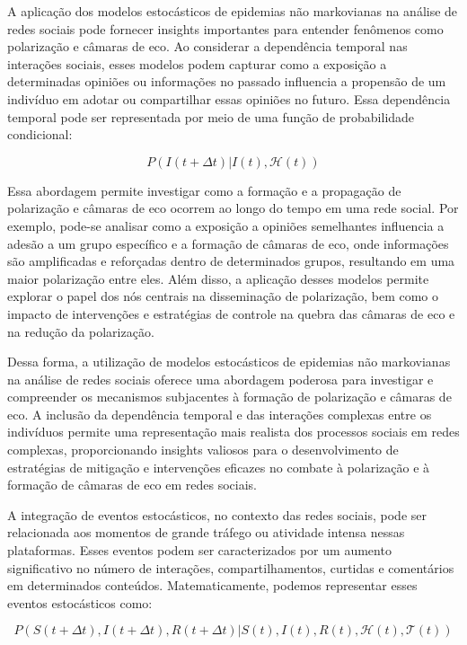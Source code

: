 A aplicação dos modelos estocásticos de epidemias não markovianas na análise de redes sociais pode fornecer insights importantes para entender fenômenos como polarização e câmaras de eco. Ao considerar a dependência temporal nas interações sociais, esses modelos podem capturar como a exposição a determinadas opiniões ou informações no passado influencia a propensão de um indivíduo em adotar ou compartilhar essas opiniões no futuro. Essa dependência temporal pode ser representada por meio de uma função de probabilidade condicional:

\begin{equation}
	P(I(t+\Delta t)|I(t), \mathcal{H}(t))
\end{equation}

Essa abordagem permite investigar como a formação e a propagação de polarização e câmaras de eco ocorrem ao longo do tempo em uma rede social. Por exemplo, pode-se analisar como a exposição a opiniões semelhantes influencia a adesão a um grupo específico e a formação de câmaras de eco, onde informações são amplificadas e reforçadas dentro de determinados grupos, resultando em uma maior polarização entre eles. Além disso, a aplicação desses modelos permite explorar o papel dos nós centrais na disseminação de polarização, bem como o impacto de intervenções e estratégias de controle na quebra das câmaras de eco e na redução da polarização.

Dessa forma, a utilização de modelos estocásticos de epidemias não markovianas na análise de redes sociais oferece uma abordagem poderosa para investigar e compreender os mecanismos subjacentes à formação de polarização e câmaras de eco. A inclusão da dependência temporal e das interações complexas entre os indivíduos permite uma representação mais realista dos processos sociais em redes complexas, proporcionando insights valiosos para o desenvolvimento de estratégias de mitigação e intervenções eficazes no combate à polarização e à formação de câmaras de eco em redes sociais.

A integração de eventos estocásticos, no contexto das redes sociais, pode ser relacionada aos momentos de grande tráfego ou atividade intensa nessas plataformas. Esses eventos podem ser caracterizados por um aumento significativo no número de interações, compartilhamentos, curtidas e comentários em determinados conteúdos. Matematicamente, podemos representar esses eventos estocásticos como:

\begin{equation}
	P(S(t+\Delta t), I(t+\Delta t), R(t+\Delta t)|S(t), I(t), R(t), \mathcal{H}(t), \mathcal{T}(t))
\end{equation}

